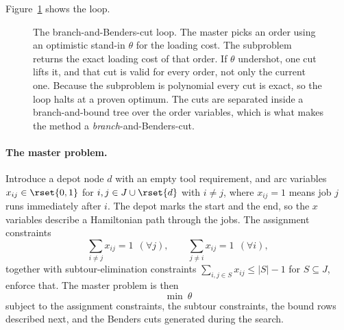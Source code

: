 Figure~\ref{fig:benders} shows the loop.

\begin{figure}[t]\centering
{}
\caption{The branch-and-Benders-cut loop. The master picks an order using an
optimistic stand-in $\theta$ for the loading cost. The subproblem returns the exact
loading cost of that order. If $\theta$ undershot, one cut lifts it, and that cut is
valid for every order, not only the current one. Because the subproblem is polynomial
every cut is exact, so the loop halts at a proven optimum. The cuts are separated
inside a branch-and-bound tree over the order variables, which is what makes the
method a \emph{branch}-and-Benders-cut.}
\label{fig:benders}
\end{figure}

\paragraph{The master problem.}
Introduce a depot node $d$ with an empty tool requirement, and arc variables
$x_{ij}\in\rset{0,1}$ for $i,j\in J\cup\rset{d}$ with $i\ne j$, where $x_{ij}=1$ means
job $j$ runs immediately after $i$. The depot marks the start and the end, so the
$x$ variables describe a Hamiltonian path through the jobs. The assignment
constraints
\[
  \sum_{i\ne j}x_{ij}=1\ \ (\forall j),\qquad \sum_{j\ne i}x_{ij}=1\ \ (\forall i),
\]
together with subtour-elimination constraints
$\sum_{i,j\in S}x_{ij}\le\lvert S\rvert-1$ for $S\subseteq J$, enforce that. The
master problem is then
\[
  \min\ \theta
\]
subject to the assignment constraints, the subtour constraints, the bound rows
described next, and the Benders cuts generated during the search.

